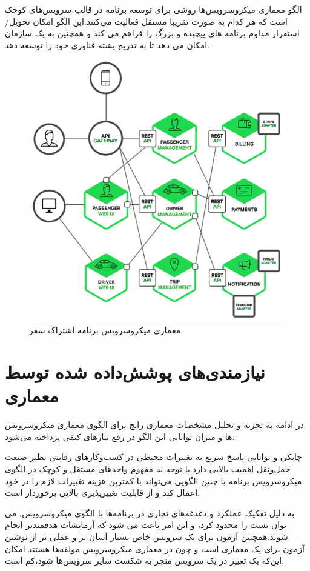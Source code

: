 الگو معماری میکرو‌سرویس‌ها روشی برای توسعه برنامه در قالب سرویس‌های کوچک است که هر کدام به صورت تقریبا مستقل فعالیت می‌کنند.این الگو امکان تحویل/استقرار مداوم برنامه های پیچیده و بزرگ را فراهم می کند و همچنین به یک سازمان امکان می دهد تا به تدریج پشته فناوری خود را توسعه دهد.
\begin{figure}[h]
\centering
\includegraphics[scale=0.7]{trip.png}
\caption{معماری میکروسرویس برنامه اشتراک سفر}
\label{fig:trip}
\end{figure}


\section{نیازمندی‌های پوشش‌داده شده توسط معماری}
در ادامه به تجزیه و تحلیل مشخصات معماری رایج برای الگوی معماری میکرو‌سرویس ها و میزان توانایی این الگو در رفع نیاز‌های کیفی پرداخته می‌شود.

چابکی و توانایی پاسخ سریع به تغییرات محیطی در کسب‌و‌کار‌های رقابتی نظیر صنعت حمل‌و‌نقل اهمیت بالایی دارد.با توجه به مفهوم واحدهای مستقل و کوچک در الگوی میکرو‌سرویس برنامه با چنین الگویی می‌تواند با کمترین هزینه تغییرات لازم را در خود اعمال کند و از قابلیت تغییر‌پذیری بالایی برخوردار است.

به دلیل تفکیک عملکرد و دغدغه‌های تجاری در برنامه‌ها با الگوی میکرو‌سرویس، می توان تست را محدود کرد، و این امر باعث می شود که آزمایشات هدفمندتر انجام شوند.همچنین آزمون برای یک سرویس خاص بسیار آسان تر و عملی تر از نوشتن آزمون برای یک معماری  است و چون در معماری میکروسرویس مولفه‌ها  هستند امکان این‌که یک تغییر در یک سرویس منجر به شکست سایر سرویس‌ها شود،کم است.

